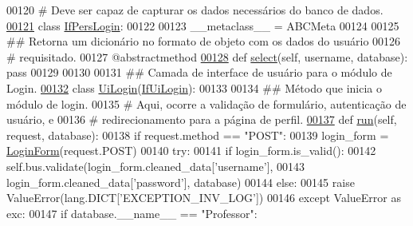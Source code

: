\begin{DoxyCode}
00120 \textcolor{comment}{#   Deve ser capaz de capturar os dados necessários do banco de dados.}
\hypertarget{LoginUnit_8py_source_l00121}{}\hyperlink{classLogin_1_1LoginUnit_1_1IfPersLogin}{00121} \textcolor{keyword}{class }\hyperlink{classLogin_1_1LoginUnit_1_1IfPersLogin}{IfPersLogin}:
00122 
00123     \_\_metaclass\_\_ = ABCMeta
00124 
00125     \textcolor{comment}{## Retorna um dicionário no formato de objeto com os dados do usuário}
00126     \textcolor{comment}{#   requisitado.}
00127     @abstractmethod
\hypertarget{LoginUnit_8py_source_l00128}{}\hyperlink{classLogin_1_1LoginUnit_1_1IfPersLogin_a2735e0cf328b85f72cbf655f210d17f6}{00128}     \textcolor{keyword}{def }\hyperlink{classLogin_1_1LoginUnit_1_1IfPersLogin_a2735e0cf328b85f72cbf655f210d17f6}{select}(self, username, database): \textcolor{keyword}{pass}
00129 
00130 
00131 \textcolor{comment}{## Camada de interface de usuário para o módulo de Login.}
\hypertarget{LoginUnit_8py_source_l00132}{}\hyperlink{classLogin_1_1LoginUnit_1_1UiLogin}{00132} \textcolor{keyword}{class }\hyperlink{classLogin_1_1LoginUnit_1_1UiLogin}{UiLogin}(\hyperlink{classLogin_1_1LoginUnit_1_1IfUiLogin}{IfUiLogin}):
00133 
00134     \textcolor{comment}{## Método que inicia o módulo de login. }
00135     \textcolor{comment}{#   Aqui, ocorre a validação de formulário, autenticação de usuário, e}
00136     \textcolor{comment}{#   redirecionamento para a página de perfil.}
\hypertarget{LoginUnit_8py_source_l00137}{}\hyperlink{classLogin_1_1LoginUnit_1_1UiLogin_a7c474f0e88183b48578c70b1781279ef}{00137}     \textcolor{keyword}{def }\hyperlink{classLogin_1_1LoginUnit_1_1UiLogin_a7c474f0e88183b48578c70b1781279ef}{run}(self, request, database):
00138         \textcolor{keywordflow}{if} request.method == \textcolor{stringliteral}{"POST"}:
00139             login\_form = \hyperlink{classLogin_1_1forms_1_1LoginForm}{LoginForm}(request.POST)
00140             \textcolor{keywordflow}{try}: 
00141                 \textcolor{keywordflow}{if} login\_form.is\_valid():
00142                     self.bus.validate(login\_form.cleaned\_data[\textcolor{stringliteral}{'username'}],
00143                         login\_form.cleaned\_data[\textcolor{stringliteral}{'password'}], database)
00144                 \textcolor{keywordflow}{else}:
00145                     \textcolor{keywordflow}{raise} ValueError(lang.DICT[\textcolor{stringliteral}{'EXCEPTION\_INV\_LOG'}])
00146             \textcolor{keywordflow}{except} ValueError \textcolor{keyword}{as} exc:
00147                 \textcolor{keywordflow}{if} database.\_\_name\_\_ == \textcolor{stringliteral}{"Professor"}:

\end{DoxyCode}
